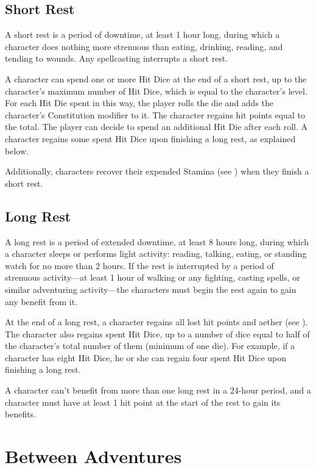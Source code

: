 \subsection{Short Rest}

A short rest is a period of downtime, at least 1 hour long, during which a character does nothing more strenuous than eating, drinking, reading, and tending to wounds. Any spellcasting interrupts a short rest.

A character can spend one or more Hit Dice at the end of a short rest, up to the character's maximum number of Hit Dice, which is equal to the character's level. For each Hit Die spent in this way, the player rolls the die and adds the character's Constitution modifier to it. The character regains hit points equal to the total. The player can decide to spend an additional Hit Die after each roll. A character regains some spent Hit Dice upon finishing a long rest, as explained below.

Additionally, characters recover their expended Stamina (see ) when they finish a short rest.

\subsection{Long Rest}

A long rest is a period of extended downtime, at least 8 hours long, during which a character sleeps or performs light activity: reading, talking, eating, or standing watch for no more than 2 hours. If the rest is interrupted by a period of strenuous activity—at least 1 hour of walking or any fighting, casting spells, or similar adventuring activity—the characters must begin the rest again to gain any benefit from it.

At the end of a long rest, a character regains all lost hit points and aether (see ). The character also regains spent Hit Dice, up to a number of dice equal to half of the character's total number of them (minimum of one die). For example, if a character has eight Hit Dice, he or she can regain four spent Hit Dice upon finishing a long rest.

A character can't benefit from more than one long rest in a 24-hour period, and a character must have at least 1 hit point at the start of the rest to gain its benefits.

\section{Between Adventures}

